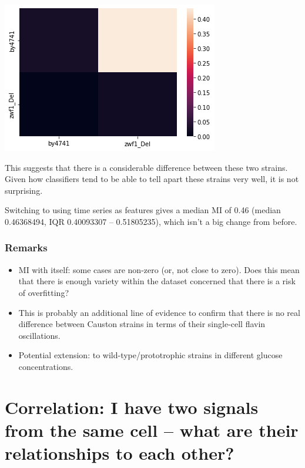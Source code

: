 \begin{center}
\includegraphics[width=.9\linewidth]{MIHierClust_20016_osc_distmatrix.png}
\end{center}

This suggests that there is a considerable difference between these two strains.  Given how classifiers tend to be able to tell apart these strains very well, it is not surprising.

Switching to using time series as features gives a median MI of 0.46 (median 0.46368494, IQR 0.40093307 -- 0.51805235), which isn't a big change from before.

\subsubsection{Remarks}
\label{sec:orga7cc61d}

\begin{itemize}
\item MI with itself: some cases are non-zero (or, not close to zero).  Does this mean that there is enough variety within the dataset concerned that there is a risk of overfitting?
\item This is probably an additional line of evidence to confirm that there is no real difference between Causton strains in terms of their single-cell flavin oscillations.
\item Potential extension: to wild-type/prototrophic strains in different glucose concentrations.
\end{itemize}


\section{Correlation: I have two signals from the same cell -- what are their relationships to each other?}
\label{sec:analysis-correlation}

